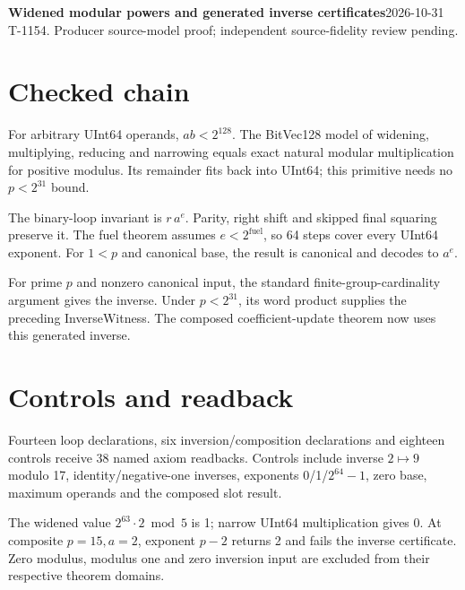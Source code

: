 \documentclass[10pt]{article}
\begin{document}
\textbf{Widened modular powers and generated inverse certificates}\hfill2026-10-31\\T-1154. Producer source-model proof; independent source-fidelity review pending.
\section*{Checked chain}
For arbitrary UInt64 operands, $ab<2^{128}$. The BitVec128 model of widening, multiplying, reducing and narrowing equals exact natural modular multiplication for positive modulus. Its remainder fits back into UInt64; this primitive needs no $p<2^{31}$ bound.

The binary-loop invariant is $r\,a^e$. Parity, right shift and skipped final squaring preserve it. The fuel theorem assumes $e<2^{\mathrm{fuel}}$, so 64 steps cover every UInt64 exponent. For $1<p$ and canonical base, the result is canonical and decodes to $a^e$.
\begin{center}\end{center}
For prime $p$ and nonzero canonical input, the standard finite-group-cardinality argument gives the inverse. Under $p<2^{31}$, its word product supplies the preceding InverseWitness. The composed coefficient-update theorem now uses this generated inverse.
\section*{Controls and readback}
Fourteen loop declarations, six inversion/composition declarations and eighteen controls receive 38 named axiom readbacks. Controls include inverse $2\mapsto9$ modulo 17, identity/negative-one inverses, exponents 0/1/$2^{64}-1$, zero base, maximum operands and the composed slot result.

The widened value $2^{63}\cdot2\bmod5$ is 1; narrow UInt64 multiplication gives 0. At composite $p=15,a=2$, exponent $p-2$ returns 2 and fails the inverse certificate. Zero modulus, modulus one and zero inversion input are excluded from their respective theorem domains.
\end{document}
